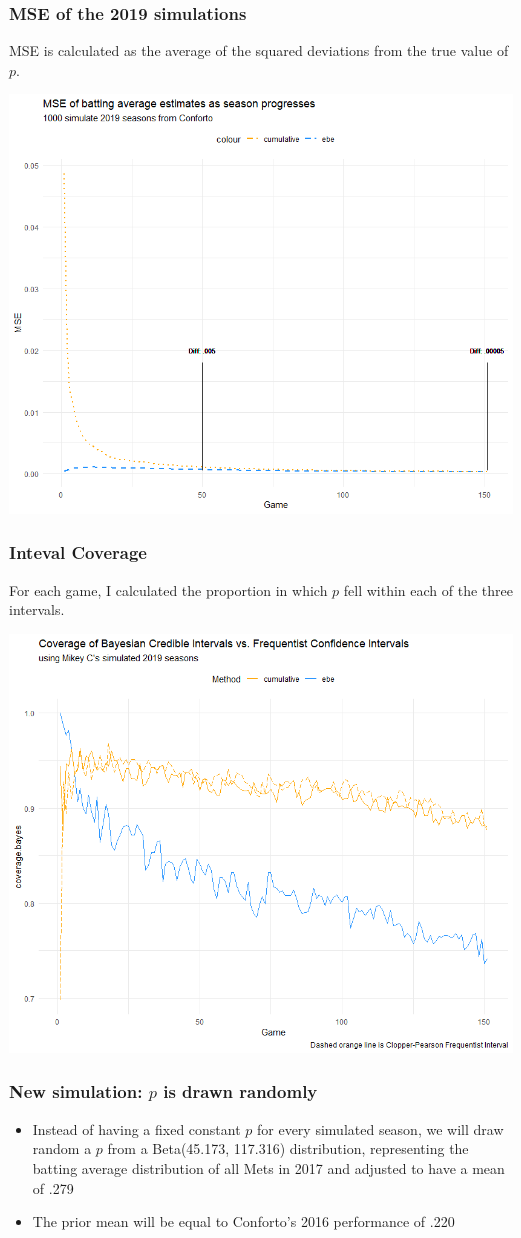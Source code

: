 \documentclass{beamer}
\begin{document}
\begin{frame}
	\frametitle{MSE of the 2019 simulations}
	MSE is calculated as the average of the squared deviations from the true value of $p$.

	\begin{center}
		\includegraphics[height=.57\linewidth,width=.7\textwidth]{mse_2019}
	\end{center}
\end{frame}

\begin{frame}
	\frametitle{Inteval Coverage}
	For each game, I calculated the proportion in which $p$ fell within each of the three intervals.

	\begin{center}
		\includegraphics[height=.57\linewidth,width=.7\textwidth]{coverages_2019}
	\end{center}
\end{frame}

\begin{frame}
	\frametitle{New simulation: $p$ is drawn randomly}
	\begin{itemize}
		\item Instead of having a fixed constant $p$ for every simulated season, we will draw random a $p$ from a Beta(45.173, 117.316) distribution, representing the batting average distribution of all Mets in 2017 and adjusted to have a mean of .279
		\item The prior mean will be equal to Conforto's 2016 performance of .220
	\end{itemize}
\end{frame}
\end{document}
